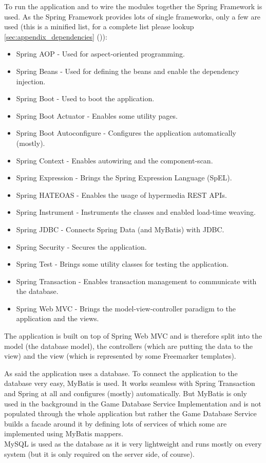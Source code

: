\documentclass[12pt]{scrreprt}
\begin{document}
				To run the application and to wire the modules together the Spring Framework is used. As the Spring Framework provides lots of single frameworks, only a few are used (this is a minified list, for a complete list please lookup \ref{sec:appendix_dependencies} ()):
				\begin{itemize}
					\item Spring AOP - Used for aspect-oriented programming.
					\item Spring Beans - Used for defining the beans and enable the dependency injection.
					\item Spring Boot - Used to boot the application.
					\item Spring Boot Actuator - Enables some utility pages.
					\item Spring Boot Autoconfigure - Configures the application automatically (mostly).
					\item Spring Context - Enables autowiring and the component-scan.
					\item Spring Expression - Brings the Spring Expression Language (SpEL).
					\item Spring HATEOAS - Enables the usage of hypermedia REST APIs.
					\item Spring Instrument - Instruments the classes and enabled load-time weaving.
					\item Spring JDBC - Connects Spring Data (and MyBatis) with JDBC.
					\item Spring Security - Secures the application.
					\item Spring Test - Brings some utility classes for testing the application.
					\item Spring Transaction - Enables transaction management to communicate with the database.
					\item Spring Web MVC - Brings the model-view-controller paradigm to the application and the views.
				\end{itemize}

				The application is built on top of Spring Web MVC and is therefore split into the model (the database model), the controllers (which are putting the data to the view) and the view (which is represented by some Freemarker templates).

				As said the application uses a database. To connect the application to the database very easy, MyBatis is used. It works seamless with Spring Transaction and Spring at all and configures (mostly) automatically. But MyBatis is only used in the background in the Game Database Service Implementation and is not populated through the whole application but rather the Game Database Service builds a facade around it by defining lots of services of which some are implemented using MyBatis mappers.
				\\
				MySQL is used as the database as it is very lightweight and runs mostly on every system (but it is only required on the server side, of course).
\end{document}
